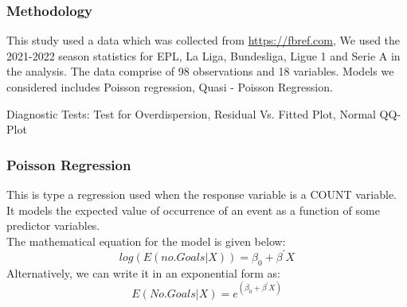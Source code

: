 \documentclass[11pt]{beamer}
\begin{document}
	\begin{frame}
		\frametitle{Methodology}
		This study used  a data which was collected from \url{ https://fbref.com}, 
		We used the
		2021-2022 season statistics for EPL, La Liga, Bundesliga, Ligue 1 and Serie A in the analysis. The data comprise of 98 observations and 18 variables.
		Models we considered includes
		Poisson regression,
		 Quasi - Poisson Regression.
		 
		Diagnostic Tests: Test for Overdispersion, Residual Vs. Fitted Plot, Normal QQ-Plot
	\end{frame}

\begin{frame}
	\frametitle{Poisson Regression}
	This is type a regression used when the response variable is a COUNT variable. It models the expected value of occurrence of an event as a function of some predictor variables.\\
	The mathematical equation for the model is given below:
	\[log(E(no.Goals|X))= \beta_0+\beta^{'}X\]
	Alternatively, we can write it in an exponential form as:
	\[E(No.Goals|X)= e^{(\beta_0+\beta^{'}X)}\]	
	
\end{frame}
\end{document}
